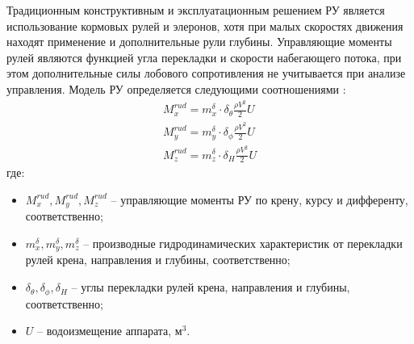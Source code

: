 Традиционным конструктивным и эксплуатационным решением РУ является использование кормовых рулей и элеронов, хотя при малых скоростях движения находят применение и дополнительные рули глубины.
Управляющие моменты рулей являются функцией угла перекладки и скорости набегающего потока, при этом дополнительные силы лобового сопротивления не учитывается при анализе управления.
Модель РУ определяется следующими соотношениями \cite{боженов1986}:
\begin{gather}
    M_x^{rud} = m_x^{\delta} \cdot \delta_{\theta} \frac{\rho V^2}{2} U \\
    M_y^{rud} = m_y^{\delta} \cdot \delta_{\phi} \frac{\rho V^2}{2} U \\
    M_z^{rud} = m_z^{\delta} \cdot \delta_{H} \frac{\rho V^2}{2} U
\end{gather}
\noindent где:
\begin{itemize}
    \item $M_x^{rud}, M_y^{rud}, M_z^{rud}$ -- управляющие моменты РУ по крену, курсу и дифференту, соответственно;
    \item $m_x^{\delta}, m_y^{\delta}, m_z^{\delta}$ -- производные гидродинамических характеристик от перекладки рулей крена, направления и глубины, соответственно;
    \item $\delta_{\theta}, \delta_{\phi}, \delta_{H}$ -- углы перекладки рулей крена, направления и глубины, соответственно;
    \item $U$ -- водоизмещение аппарата, м$^3$.
\end{itemize}